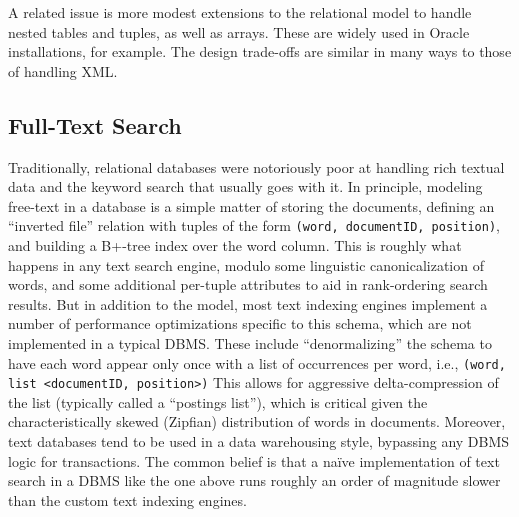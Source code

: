\documentclass[a4paper,11pt,twoside,openright]{book}
\begin{document}
A related issue is more modest extensions to the relational model to
handle nested tables and tuples, as well as arrays. These are widely
used in Oracle installations, for example. The design trade-offs are
similar in many ways to those of handling XML.

\hypertarget{full-text-search}{%
\subsection{Full-Text Search}\label{full-text-search}}

Traditionally, relational databases were notoriously poor at handling
rich textual data and the keyword search that usually goes with it. In
principle, modeling free-text in a database is a simple matter of
storing the documents, defining an ``inverted file'' relation with
tuples of the form \texttt{(word, documentID, position)}, and building a B+-tree
index over the word column. This is roughly what happens in any text
search engine, modulo some linguistic canonicalization of words, and
some additional per-tuple attributes to aid in rank-ordering search
results. But in addition to the model, most text indexing engines
implement a number of performance optimizations specific to this schema,
which are not implemented in a typical DBMS. These include
``denormalizing'' the schema to have each word appear only once with a
list of occurrences per word, i.e., \texttt{(word, list \textless{}documentID,
position\textgreater{})} This allows for aggressive delta-compression of
the list (typically called a ``postings list''), which is critical given
the characteristically skewed (Zipfian) distribution of words in
documents. Moreover, text databases tend to be used in a data
warehousing style, bypassing any DBMS logic for transactions. The common
belief is that a na\"ive implementation of text search in a DBMS like the
one above runs roughly an order of magnitude slower than the custom text
indexing engines.
\end{document}
